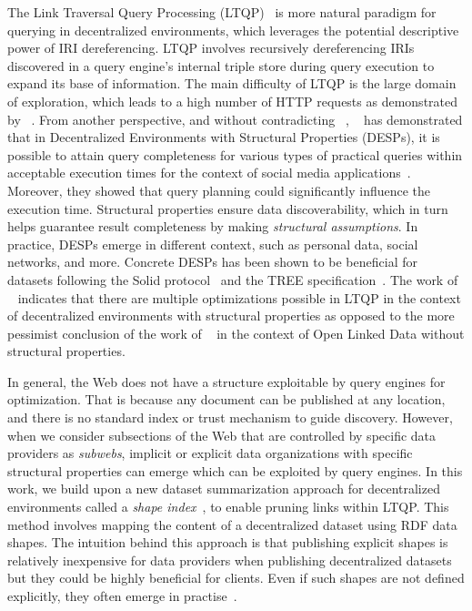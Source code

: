 The Link Traversal Query Processing (LTQP)~\cite{Hartig2012} is more natural paradigm for querying in decentralized environments,
which leverages the potential descriptive power of IRI dereferencing.
LTQP involves recursively dereferencing IRIs discovered in a query engine's internal triple store during query execution to expand its base of information.
The main difficulty of LTQP is the large domain of exploration, which leads to a high number of HTTP requests as demonstrated by \citeauthor{hartig2016walking}~\cite{hartig2016walking}.
From another perspective, and without contradicting \citeauthor{hartig2016walking}~\cite{hartig2016walking}, \citeauthor{Taelman2023}~\cite{Taelman2023} has demonstrated that in Decentralized Environments with Structural Properties (DESPs), it is possible to attain query completeness for various types of practical queries within acceptable execution times for the context of social media applications~\cite{nielsen1993response}.
Moreover, they showed that query planning could significantly influence the execution time.
Structural properties ensure data discoverability, which in turn helps guarantee result completeness by making \emph{structural assumptions}.
In practice, DESPs emerge in different context, such as personal data, social networks, and more.
Concrete DESPs has been shown to be beneficial for datasets following the Solid protocol~\cite{Taelman2023} and the TREE specification~\cite{tam_iswc_traversalsensortree_2024}.
The work of \citeauthor{Taelman2023}~\cite{Taelman2023} indicates that there are multiple optimizations possible in LTQP in the context of decentralized environments with structural properties as opposed to the
more pessimist conclusion of the work of \citeauthor{hartig2016walking}~\cite{hartig2016walking} in the context of Open Linked Data without structural properties.

In general, the Web does not have a structure exploitable by query engines for optimization.
That is because any document can be published at any location, and there is no standard index or trust mechanism to guide discovery.
However, when we consider subsections of the Web that are controlled by specific data providers as \emph{subwebs},
implicit or explicit data organizations with specific structural properties can emerge
which can be exploited by query engines.
In this work, we build upon a new dataset summarization approach for decentralized environments called a \emph{shape index}~\cite{tam2024opportunitiesshapebasedoptimizationlink},
to enable pruning links within LTQP.
This method involves mapping the content of a decentralized dataset using RDF data shapes.
The intuition behind this approach is that publishing explicit shapes is relatively inexpensive for data providers when publishing decentralized datasets but they could be highly beneficial for clients.
Even if such shapes are not defined explicitly, they often emerge in practise~\cite{Neumann2011CharacteristicSA}.

